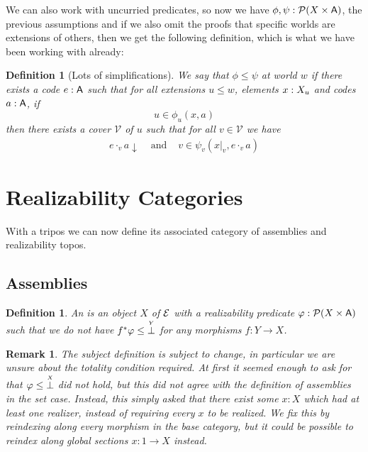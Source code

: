 \documentclass[11pt]{article}
\newtheorem{defn}[thrm]{Definition}
\newtheorem{remk}[thrm]{Remark}
\begin{document}
We can also work with uncurried predicates, so now we have
\(\phi,\psi : \mathcal{P}{(X\times\mathsf{A})}\), the previous assumptions and if we
also omit the proofs that specific worlds are extensions of others, then
we get the following definition, which is what we have been working with
already:
%
\begin{defn}[Lots of simplifications]
  We say that \(\phi \leq \psi\) at world \(w\) if there exists a code
  \(e : \mathsf{A}\) such that for all extensions \(u \leq w\), elements
  \(x : X_{u}\) and codes \(a : \mathsf{A}\), if
  \[
    u \in \phi_{u}(x, a)
  \]
  then there exists a cover \(\mathcal{V}\) of \(u\) such that for all \(v \in \mathcal{V}\) we
  have
  \[\begin{array}{ccc}
    e \cdot_{v} a \downarrow &\text{ and }&
    v \in \psi_{v}(x|_{v}, e \cdot_{v} a)
  \end{array}\]
\end{defn}

\section{Realizability Categories}%
\label{sec:realizability-categories}

With a tripos we can now define its associated category of assemblies
and realizability topos.

\subsection{Assemblies}%
\label{sub:assemblies}

\begin{defn}\label{defn:assembly}
  An  is an object \(X\) of \(\mathcal{E}\) with a realizability
  predicate \(\varphi : \mathcal{P}{({X}\times{\ensuremath{\mathsf{A}}})}\) such that we do not have
  \({f}^\ast\varphi \leq \overset{\scriptscriptstyle Y}{\bot}\) for any morphisms \(f : Y \to X\).
\end{defn}

\begin{remk}
  The subject definition is subject to change, in particular we are
  unsure about the totality condition required.
  At first it seemed enough to ask for that \(\varphi \leq \overset{\scriptscriptstyle X}{\bot}\)
  did not hold, but this did not agree with the definition of assemblies in
  the set case.
  Instead, this simply asked that there exist some \(x:X\) which had at least
  one realizer, instead of requiring every \(x\) to be realized.
  We fix this by reindexing along every morphism in the base category,
  but it could be possible to reindex along global sections \(x : 1 \to X\)
  instead.
\end{remk}
\end{document}
